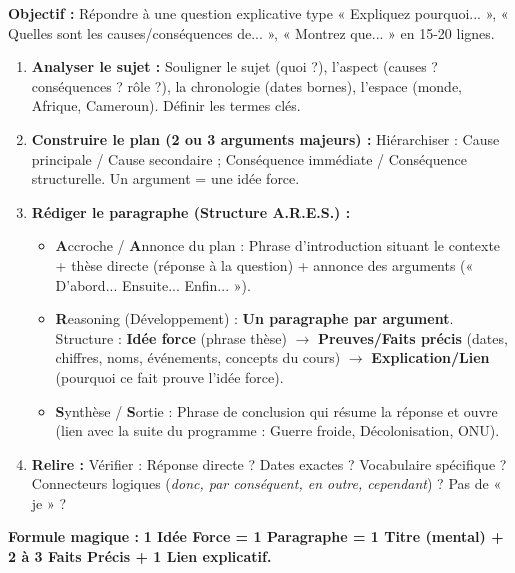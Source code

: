 \documentclass[11pt]{article}
\newcommand{\cle}[1]{{\popxbold\color{popdark}#1}}
\begin{document}
\begin{methode}
\textbf{Objectif :} Répondre à une question explicative type « Expliquez pourquoi... », « Quelles sont les causes/conséquences de... », « Montrez que... » en 15-20 lignes.
\begin{enumerate}
    \item \textbf{Analyser le sujet :} Souligner le \cle{sujet} (quoi ?), l'\cle{aspect} (causes ? conséquences ? rôle ?), la \cle{chronologie} (dates bornes), l'\cle{espace} (monde, Afrique, Cameroun). Définir les termes clés.
    \item \textbf{Construire le plan (2 ou 3 arguments majeurs) :} Hiérarchiser : Cause principale / Cause secondaire ; Conséquence immédiate / Conséquence structurelle. Un argument = une idée force.
    \item \textbf{Rédiger le paragraphe (Structure A.R.E.S.) :}
    \begin{itemize}
        \item \textbf{A}ccroche / \textbf{A}nnonce du plan : Phrase d'introduction situant le contexte + thèse directe (réponse à la question) + annonce des arguments (« D'abord... Ensuite... Enfin... »).
        \item \textbf{R}easoning (Développement) : \textbf{Un paragraphe par argument}. Structure : \textbf{Idée force} (phrase thèse) $\rightarrow$ \textbf{Preuves/Faits précis} (dates, chiffres, noms, événements, concepts du cours) $\rightarrow$ \textbf{Explication/Lien} (pourquoi ce fait prouve l'idée force).
        \item \textbf{S}ynthèse / \textbf{S}ortie : Phrase de conclusion qui résume la réponse et ouvre (lien avec la suite du programme : Guerre froide, Décolonisation, ONU).
    \end{itemize}
    \item \textbf{Relire :} Vérifier : Réponse directe ? Dates exactes ? Vocabulaire spécifique ? Connecteurs logiques (\textit{donc, par conséquent, en outre, cependant}) ? Pas de « je » ?
\end{enumerate}
\textbf{Formule magique :} \textbf{1 Idée Force = 1 Paragraphe = 1 Titre (mental) + 2 à 3 Faits Précis + 1 Lien explicatif.}
\end{methode}
\end{document}
